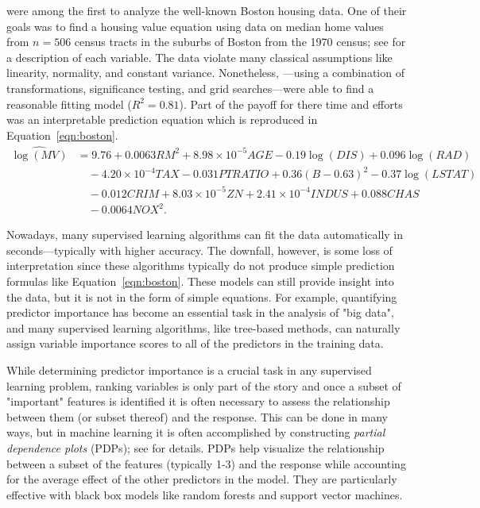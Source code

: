 \documentclass[12pt]{article}
\begin{document}
\citet{harrison-1978-hedonic} were among the first to analyze the well-known Boston housing data. One of their goals was to find a housing value equation using data on median home values from $n = 506$ census tracts in the suburbs of Boston from the 1970 census; see \citet[Table IV]{harrison-1978-hedonic} for a description of each variable. The data violate many classical assumptions like linearity, normality, and constant variance. Nonetheless, \citeauthor{harrison-1978-hedonic}---using a combination of transformations, significance testing, and grid searches---were able to find a reasonable fitting model ($R^2 = 0.81$). Part of the payoff for there time and efforts was an interpretable prediction equation which is reproduced in Equation~\eqref{eqn:boston}.
\begin{equation}
\label{eqn:boston}
\begin{aligned}
\widehat{\log\left(MV\right)} &= 9.76 + 0.0063 RM^2 + 8.98\times10^{-5} AGE - 0.19\log\left(DIS\right) + 0.096\log\left(RAD\right) \\
  & \quad - 4.20\times10^{-4} TAX - 0.031 PTRATIO + 0.36\left(B - 0.63\right)^2 - 0.37\log\left(LSTAT\right) \\
  & \quad - 0.012 CRIM + 8.03\times10^{-5} ZN + 2.41\times10^{-4} INDUS + 0.088 CHAS \\
  & \quad - 0.0064 NOX^2.
\end{aligned}
\end{equation}

Nowadays, many supervised learning algorithms can fit the data automatically in seconds---typically with higher accuracy. The downfall, however, is some loss of interpretation since these algorithms typically do not produce simple prediction formulas like Equation~\eqref{eqn:boston}. These models can still provide insight into the data, but it is not in the form of simple equations. For example, quantifying predictor importance has become an essential task in the analysis of "big data", and many supervised learning algorithms, like tree-based methods, can naturally assign variable importance scores to all of the predictors in the training data.

While determining predictor importance is a crucial task in any supervised learning problem, ranking variables is only part of the story and once a subset of "important" features is identified it is often necessary to assess the relationship between them (or subset thereof) and the response. This can be done in many ways, but in machine learning it is often accomplished by constructing \textit{partial dependence plots} (PDPs); see \citet{friedman-2001-greedy} for details. PDPs help visualize the relationship between a subset of the features (typically 1-3) and the response while accounting for the average effect of the other predictors in the model. They are particularly effective with black box models like random forests and support vector machines.
\end{document}
